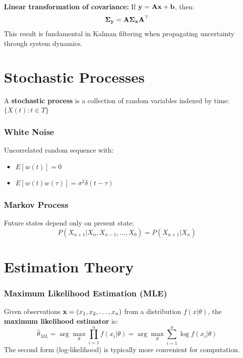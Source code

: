 \textbf{Linear transformation of covariance:} If $\mathbf{y} = \mathbf{A}\mathbf{x} + \mathbf{b}$, then:
\begin{equation}
\boldsymbol{\Sigma}_{\mathbf{y}} = \mathbf{A} \boldsymbol{\Sigma}_{\mathbf{x}} \mathbf{A}^\top
\end{equation}
This result is fundamental in Kalman filtering when propagating uncertainty through system dynamics.

\section{Stochastic Processes}

A \textbf{stochastic process} is a collection of random variables indexed by time: $\{X(t) : t \in T\}$

\subsubsection{White Noise}
Uncorrelated random sequence with:
\begin{itemize}
    \item $E[w(t)] = 0$
    \item $E[w(t)w(\tau)] = \sigma^2\delta(t-\tau)$
\end{itemize}

\subsubsection{Markov Process}
Future states depend only on present state:
\begin{equation}
P(X_{n+1}|X_n, X_{n-1}, \ldots, X_0) = P(X_{n+1}|X_n)
\end{equation}

\section{Estimation Theory}

\subsubsection{Maximum Likelihood Estimation (MLE)}

\begin{definitionbox}[title=Definition: Maximum Likelihood Estimator]
Given observations $\mathbf{x} = (x_1, x_2, \ldots, x_n)$ from a distribution $f(x|\theta)$, the \textbf{maximum likelihood estimator} is:
\begin{equation}
\hat{\theta}_{ML} = \arg\max_\theta \prod_{i=1}^n f(x_i|\theta) = \arg\max_\theta \sum_{i=1}^n \log f(x_i|\theta)
\end{equation}
The second form (log-likelihood) is typically more convenient for computation.
\end{definitionbox}

